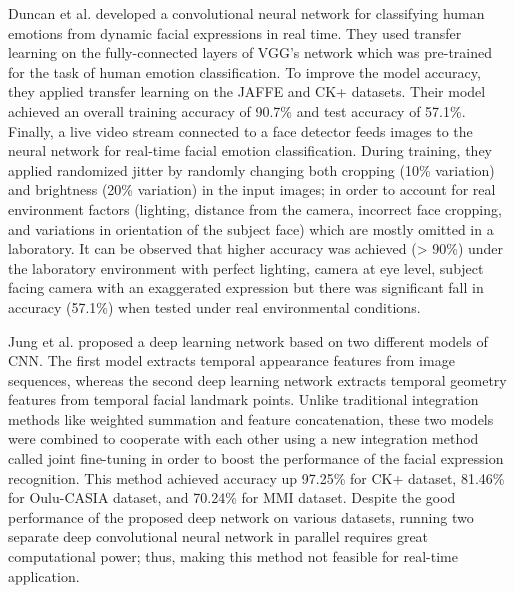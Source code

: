 \documentclass[master]{thesis-uestc}
\begin{document}
Duncan et al. developed a convolutional neural network for classifying human emotions from dynamic facial expressions in real time. They used transfer learning on the fully-connected layers of VGG's network which was pre-trained for the task of human emotion classification. To improve the model accuracy, they applied transfer learning on the JAFFE and CK+ datasets. Their model achieved an overall training accuracy of 90.7\% and test accuracy of 57.1\%. Finally, a live video stream connected to a face detector feeds images to the neural network for real-time facial emotion classification. During training, they applied randomized jitter by randomly changing both cropping (10\% variation) and brightness (20\% variation) in the input images; in order to account for real environment factors (lighting, distance from the camera, incorrect face cropping, and variations in orientation of the subject face) which are mostly omitted in a laboratory. It can be observed that higher accuracy was achieved (> 90\%) under the laboratory environment with perfect lighting, camera at eye level, subject facing camera with an exaggerated expression but there was significant fall in accuracy (57.1\%) when tested under real environmental conditions.

Jung et al. proposed a deep learning network based on two different models of CNN. The first model extracts temporal appearance features from image sequences, whereas the second deep learning network extracts temporal geometry features from temporal facial landmark points. Unlike traditional integration methods like weighted summation and feature concatenation, these two models were combined to cooperate with each other using a new integration method called joint fine-tuning in order to boost the performance of the facial expression recognition. This method achieved accuracy up 97.25\% for CK+ dataset, 81.46\% for Oulu-CASIA dataset, and 70.24\% for MMI dataset. Despite the good performance of the proposed deep network on various datasets, running two separate deep convolutional neural network in parallel requires great computational power; thus, making this method not feasible for real-time application.
\end{document}
